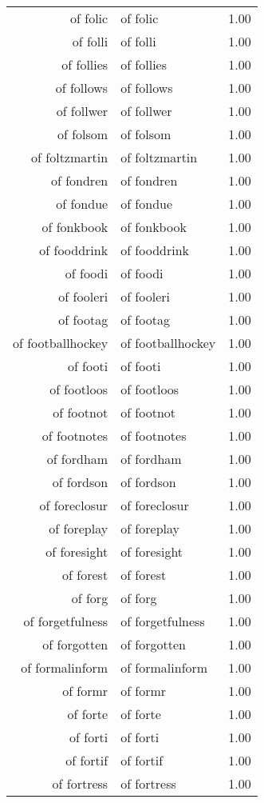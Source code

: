 \begin{table}[ht]
\begin{tabular}{rlr}
  of folic & of folic & 1.00 \\ 
  of folli & of folli & 1.00 \\ 
  of follies & of follies & 1.00 \\ 
  of follows & of follows & 1.00 \\ 
  of follwer & of follwer & 1.00 \\ 
  of folsom & of folsom & 1.00 \\ 
  of foltzmartin & of foltzmartin & 1.00 \\ 
  of fondren & of fondren & 1.00 \\ 
  of fondue & of fondue & 1.00 \\ 
  of fonkbook & of fonkbook & 1.00 \\ 
  of fooddrink & of fooddrink & 1.00 \\ 
  of foodi & of foodi & 1.00 \\ 
  of fooleri & of fooleri & 1.00 \\ 
  of footag & of footag & 1.00 \\ 
  of footballhockey & of footballhockey & 1.00 \\ 
  of footi & of footi & 1.00 \\ 
  of footloos & of footloos & 1.00 \\ 
  of footnot & of footnot & 1.00 \\ 
  of footnotes & of footnotes & 1.00 \\ 
  of fordham & of fordham & 1.00 \\ 
  of fordson & of fordson & 1.00 \\ 
  of foreclosur & of foreclosur & 1.00 \\ 
  of foreplay & of foreplay & 1.00 \\ 
  of foresight & of foresight & 1.00 \\ 
  of forest & of forest & 1.00 \\ 
  of forg & of forg & 1.00 \\ 
  of forgetfulness & of forgetfulness & 1.00 \\ 
  of forgotten & of forgotten & 1.00 \\ 
  of formalinform & of formalinform & 1.00 \\ 
  of formr & of formr & 1.00 \\ 
  of forte & of forte & 1.00 \\ 
  of forti & of forti & 1.00 \\ 
  of fortif & of fortif & 1.00 \\ 
  of fortress & of fortress & 1.00 \\ 

\end{tabular}
\end{table}
